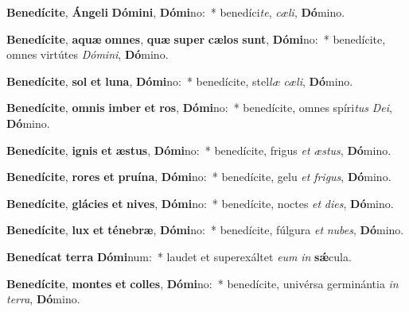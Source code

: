 \item \textbf{Be}\textbf{ne}\textbf{dí}\textbf{ci}\textbf{te}, \textbf{Án}\textbf{ge}\textbf{li} \textbf{Dó}\textbf{mi}\textbf{ni}, \textbf{Dó}\textbf{mi}no:~* benedíci\textit{te}, \textit{cæ}\textit{li}, \textbf{Dó}mino.
\item \textbf{Be}\textbf{ne}\textbf{dí}\textbf{ci}\textbf{te}, \textbf{a}\textbf{quæ} \textbf{om}\textbf{nes}, \textbf{quæ} \textbf{su}\textbf{per} \textbf{cæ}\textbf{los} \textbf{sunt}, \textbf{Dó}\textbf{mi}no:~* benedícite, omnes virtútes \textit{Dó}\textit{mi}\textit{ni}, \textbf{Dó}mino.
\item \textbf{Be}\textbf{ne}\textbf{dí}\textbf{ci}\textbf{te}, \textbf{sol} \textbf{et} \textbf{lu}\textbf{na}, \textbf{Dó}\textbf{mi}no:~* benedícite, stel\textit{læ} \textit{cæ}\textit{li}, \textbf{Dó}mino.
\item \textbf{Be}\textbf{ne}\textbf{dí}\textbf{ci}\textbf{te}, \textbf{om}\textbf{nis} \textbf{im}\textbf{ber} \textbf{et} \textbf{ros}, \textbf{Dó}\textbf{mi}no:~* benedícite, omnes spíri\textit{tus} \textit{De}\textit{i}, \textbf{Dó}mino.
\item \textbf{Be}\textbf{ne}\textbf{dí}\textbf{ci}\textbf{te}, \textbf{i}\textbf{gnis} \textbf{et} \textbf{æs}\textbf{tus}, \textbf{Dó}\textbf{mi}no:~* benedícite, frigus \textit{et} \textit{æs}\textit{tus}, \textbf{Dó}mino.
\item \textbf{Be}\textbf{ne}\textbf{dí}\textbf{ci}\textbf{te}, \textbf{ro}\textbf{res} \textbf{et} \textbf{pru}\textbf{í}\textbf{na}, \textbf{Dó}\textbf{mi}no:~* benedícite, gelu \textit{et} \textit{fri}\textit{gus}, \textbf{Dó}mino.
\item \textbf{Be}\textbf{ne}\textbf{dí}\textbf{ci}\textbf{te}, \textbf{glá}\textbf{ci}\textbf{es} \textbf{et} \textbf{ni}\textbf{ves}, \textbf{Dó}\textbf{mi}no:~* benedícite, noctes \textit{et} \textit{di}\textit{es}, \textbf{Dó}mino.
\item \textbf{Be}\textbf{ne}\textbf{dí}\textbf{ci}\textbf{te}, \textbf{lux} \textbf{et} \textbf{té}\textbf{ne}\textbf{bræ}, \textbf{Dó}\textbf{mi}no:~* benedícite, fúlgura \textit{et} \textit{nu}\textit{bes}, \textbf{Dó}mino.
\item \textbf{Be}\textbf{ne}\textbf{dí}\textbf{cat} \textbf{ter}\textbf{ra} \textbf{Dó}\textbf{mi}num:~* laudet et superexáltet \textit{e}\textit{um} \textit{in} \textbf{sǽ}cula.
\item \textbf{Be}\textbf{ne}\textbf{dí}\textbf{ci}\textbf{te}, \textbf{mon}\textbf{tes} \textbf{et} \textbf{col}\textbf{les}, \textbf{Dó}\textbf{mi}no:~* benedícite, univérsa germinántia \textit{in} \textit{ter}\textit{ra}, \textbf{Dó}mino.
